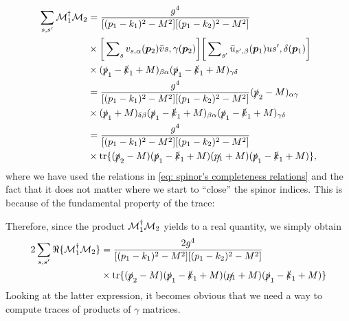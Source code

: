 \begin{equation}
    \begin{split}
        \sum_{s,s'}\mathcal{M}_1^\dagger\mathcal{M}_2 &= \frac{g^4}{[(p_1 - k_1)^2 - M^2][(p_1 - k_2)^2 - M^2]} \\
        &\times \bigg[\sum\nolimits_{s}v_{s,\alpha}(\bm{p}_2)\bar{v}{s,\gamma}(\bm{p}_2)\bigg]\bigg[\sum\nolimits_{s'}\bar{u}_{s',\beta}(\bm{p}_1)u{s',\delta}(\bm{p}_1)\bigg] \\
        &\times (\slashed{p}_1 - \slashed{k}_1 + M)_{\beta\alpha}(\slashed{p}_1 - \slashed{k}_1 + M)_{\gamma\delta} \\
        &= \frac{g^4}{[(p_1 - k_1)^2 - M^2][(p_1 - k_2)^2 - M^2]}(\slashed{p}_2 - M)_{\alpha\gamma} \\
        &\times (\slashed{p}_1 + M)_{\delta\beta}(\slashed{p}_1 - \slashed{k}_1 + M)_{\beta\alpha}(\slashed{p}_1 - \slashed{k}_1 + M)_{\gamma\delta} \\
        &= \frac{g^4}{[(p_1 - k_1)^2 - M^2][(p_1 - k_2)^2 - M^2]} \\
        &\times \mathrm{tr}\{(\slashed{p}_2 - M)(\slashed{p}_1 - \slashed{k}_1 + M)(\slashed{p_1} + M)(\slashed{p}_1 - \slashed{k}_1 + M)\},
    \end{split}
\end{equation}
where we have used the relations in \eqref{eq: spinor's completeness relations} and the fact that it does not matter where we start to ``close'' the spinor indices. This is because of the fundamental property of the trace: 
\begin{quote}
    \centering
\end{quote}
Therefore, since the product $\mathcal{M}_1^\dagger\mathcal{M}_2$ yields to a real quantity, we simply obtain 
\begin{equation}
    \begin{split}
        2\sum_{s,s'}\Re{\{\mathcal{M}_1^\dagger\mathcal{M}_2\}} &= \frac{2g^4}{[(p_1 - k_1)^2 - M^2][(p_1 - k_2)^2 - M^2]} \\
        &\times \mathrm{tr}\{(\slashed{p}_2 - M)(\slashed{p}_1 - \slashed{k}_1 + M)(\slashed{p_1} + M)(\slashed{p}_1 - \slashed{k}_1 + M)\}
    \end{split}
\end{equation}
Looking at the latter expression, it becomes obvious that we need a way to compute traces of products of $\gamma$ matrices. 

